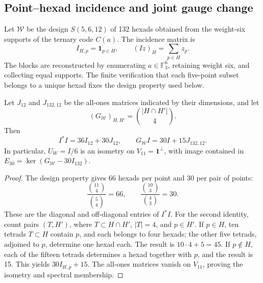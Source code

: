 \subsection{Point--hexad incidence and joint gauge change}

Let \(\mathcal W\) be the design \(S(5,6,12)\) of 132 hexads obtained
from the weight-six supports of the ternary code \(C(a)\). The incidence
matrix is
\[
 I_{H,p}=\mathbf1_{p\in H},\qquad
 (Iz)_H=\sum_{p\in H}z_p.
\]
The blocks are reconstructed by enumerating \(a\in\mathbb F_3^6\),
retaining weight six, and collecting equal supports. The finite
verification that each five-point subset belongs to a unique
hexad fixes the design property used below.

\begin{lemma}
\label{lem:ii-witt-incidence-identities}
Let \(J_{12}\) and \(J_{132,12}\) be the all-ones matrices indicated by
their dimensions, and let
\[
 (G_{\mathcal W})_{H,H'}=\binom{|H\cap H'|}{4}.
\]
Then
\begin{equation}
 I^*I=36I_{12}+30J_{12},\qquad
 G_{\mathcal W}I=30I+15J_{132,12}.
 \label{eq:ii-witt-incidence-identities}
\end{equation}
In particular, \(U_W=I/6\) is an isometry on
\(V_{11}=\mathbf1^\perp\), with image contained in
\(E_{30}=\ker(G_{\mathcal W}-30I_{132})\).
\end{lemma}
\begin{proof}
The design property gives 66 hexads per point and 30 per pair of points:
\[
 \frac{\binom{11}{4}}{\binom54}=66,
 \qquad \frac{\binom{10}{3}}{\binom43}=30.
\]
These are the diagonal and off-diagonal entries of \(I^*I\).
For the second identity, count pairs \((T,H')\), where
\(T\subset H\cap H'\), \(|T|=4\), and \(p\in H'\).
If \(p\in H\), ten tetrads \(T\subset H\) contain \(p\),
and each belongs to four hexads; the other five tetrads,
adjoined to \(p\), determine one hexad each. The result is
\(10\cdot4+5=45\). If \(p\notin H\), each of the fifteen
tetrads determines a hexad together with \(p\), and the result is 15.
This yields \(30I_{H,p}+15\). The all-ones matrices vanish on
\(V_{11}\), proving the isometry and spectral membership.
\end{proof}

